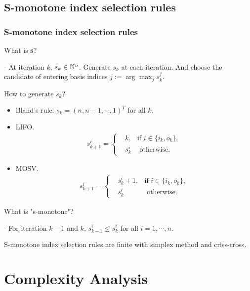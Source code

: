 \documentclass{beamer}
\begin{document}
\subsection{S-monotone index selection rules}
\begin{frame}
\frametitle{S-monotone index selection rules\cite{csizmadia2012s}}
What is \textbf{s}?

- At iteration $k$, $s_k \in \mathbb{N}^{n}$. Generate $s_k$ at each iteration. And choose the candidate of entering basis indices $j := \arg \max_j {s_k^j}$.

How to generate $s_k$?

\begin{itemize}
\item Bland's rule: $s_k = (n, n-1, \cdots, 1)^T$ for all $k$.
\item LIFO. \begin{align*}
s_{k+1}^i = \left\{
\begin{aligned}
&k, & \text{if } i \in \{i_k, o_k\},\\
&s_k^i & \text{ otherwise}. 
\end{aligned}
\right.
\end{align*}
\item MOSV. \begin{align*}
s_{k+1}^i = \left\{
\begin{aligned}
&s_k^{i} + 1, & \text{if } i \in \{i_k, o_k\},\\
&s_k^i & \text{ otherwise}. 
\end{aligned}
\right.
\end{align*}
\end{itemize}

What is "s-monotone"?

- For iteration $k-1$ and $k$, $s_{k-1}^i \le s_{k}^i$ for all $i= 1,\cdots, n$.

S-monotone index selection rules are finite with simplex method and criss-cross.
\end{frame}



\section{Complexity Analysis}
\end{document}
